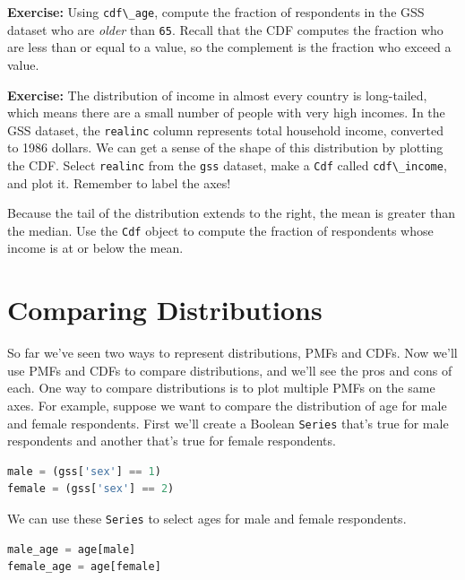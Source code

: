 \textbf{Exercise:} Using \passthrough{\lstinline!cdf\_age!}, compute the
fraction of respondents in the GSS dataset who are \emph{older} than
\passthrough{\lstinline!65!}. Recall that the CDF computes the fraction
who are less than or equal to a value, so the complement is the fraction
who exceed a value.

\textbf{Exercise:} The distribution of income in almost every country is
long-tailed, which means there are a small number of people with very
high incomes. In the GSS dataset, the \passthrough{\lstinline!realinc!}
column represents total household income, converted to 1986 dollars. We
can get a sense of the shape of this distribution by plotting the CDF.
Select \passthrough{\lstinline!realinc!} from the
\passthrough{\lstinline!gss!} dataset, make a
\passthrough{\lstinline!Cdf!} called
\passthrough{\lstinline!cdf\_income!}, and plot it. Remember to label
the axes!

Because the tail of the distribution extends to the right, the mean is
greater than the median. Use the \passthrough{\lstinline!Cdf!} object to
compute the fraction of respondents whose income is at or below the
mean.

\section{Comparing Distributions}\label{comparing-distributions}

So far we've seen two ways to represent distributions, PMFs and CDFs.
Now we'll use PMFs and CDFs to compare distributions, and we'll see the
pros and cons of each. One way to compare distributions is to plot
multiple PMFs on the same axes. For example, suppose we want to compare
the distribution of age for male and female respondents. First we'll
create a Boolean \passthrough{\lstinline!Series!} that's true for male
respondents and another that's true for female respondents.

\begin{lstlisting}[language=Python,style=source]
male = (gss['sex'] == 1)
female = (gss['sex'] == 2)
\end{lstlisting}

We can use these \passthrough{\lstinline!Series!} to select ages for
male and female respondents.

\begin{lstlisting}[language=Python,style=source]
male_age = age[male]
female_age = age[female]
\end{lstlisting}

